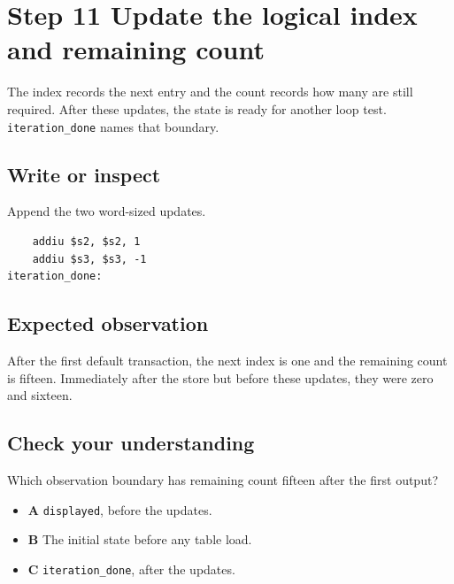 \section{Step 11 Update the logical index and remaining
  count}\label{005-seven-segment-counter-s11-step-11-update-the-logical-index-and-remaining-count}

The index records the next entry and the count records how many are
still required. After these updates, the state is ready for another loop
test. \texttt{iteration\_done} names that boundary.

\subsection{Write or
  inspect}\label{005-seven-segment-counter-s11-write-or-inspect}

Append the two word-sized updates.

\begin{verbatim}
    addiu $s2, $s2, 1
    addiu $s3, $s3, -1
iteration_done:
\end{verbatim}

\subsection{Expected
  observation}\label{005-seven-segment-counter-s11-expected-observation}

After the first default transaction, the next index is one and the
remaining count is fifteen. Immediately after the store but before these
updates, they were zero and sixteen.

\subsection{Check your
  understanding}\label{005-seven-segment-counter-s11-check-your-understanding}

Which observation boundary has remaining count fifteen after the first
output?

\begin{itemize}
  \tightlist
  \item
        \textbf{A} \texttt{displayed}, before the updates.
  \item
        \textbf{B} The initial state before any table load.
  \item
        \textbf{C} \texttt{iteration\_done}, after the updates.
\end{itemize}
